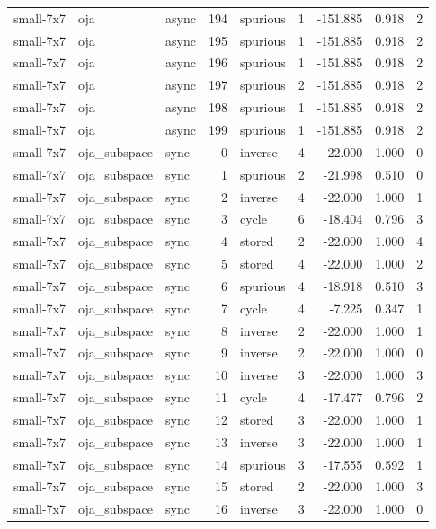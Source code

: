 \begin{tabular}{lllrlrrrr}
small-7x7 & oja & async & 194 & spurious & 1 & -151.885 & 0.918 & 2 \\
small-7x7 & oja & async & 195 & spurious & 1 & -151.885 & 0.918 & 2 \\
small-7x7 & oja & async & 196 & spurious & 1 & -151.885 & 0.918 & 2 \\
small-7x7 & oja & async & 197 & spurious & 2 & -151.885 & 0.918 & 2 \\
small-7x7 & oja & async & 198 & spurious & 1 & -151.885 & 0.918 & 2 \\
small-7x7 & oja & async & 199 & spurious & 1 & -151.885 & 0.918 & 2 \\
small-7x7 & oja\_subspace & sync & 0 & inverse & 4 & -22.000 & 1.000 & 0 \\
small-7x7 & oja\_subspace & sync & 1 & spurious & 2 & -21.998 & 0.510 & 0 \\
small-7x7 & oja\_subspace & sync & 2 & inverse & 4 & -22.000 & 1.000 & 1 \\
small-7x7 & oja\_subspace & sync & 3 & cycle & 6 & -18.404 & 0.796 & 3 \\
small-7x7 & oja\_subspace & sync & 4 & stored & 2 & -22.000 & 1.000 & 4 \\
small-7x7 & oja\_subspace & sync & 5 & stored & 4 & -22.000 & 1.000 & 2 \\
small-7x7 & oja\_subspace & sync & 6 & spurious & 4 & -18.918 & 0.510 & 3 \\
small-7x7 & oja\_subspace & sync & 7 & cycle & 4 & -7.225 & 0.347 & 1 \\
small-7x7 & oja\_subspace & sync & 8 & inverse & 2 & -22.000 & 1.000 & 1 \\
small-7x7 & oja\_subspace & sync & 9 & inverse & 2 & -22.000 & 1.000 & 0 \\
small-7x7 & oja\_subspace & sync & 10 & inverse & 3 & -22.000 & 1.000 & 3 \\
small-7x7 & oja\_subspace & sync & 11 & cycle & 4 & -17.477 & 0.796 & 2 \\
small-7x7 & oja\_subspace & sync & 12 & stored & 3 & -22.000 & 1.000 & 1 \\
small-7x7 & oja\_subspace & sync & 13 & inverse & 3 & -22.000 & 1.000 & 1 \\
small-7x7 & oja\_subspace & sync & 14 & spurious & 3 & -17.555 & 0.592 & 1 \\
small-7x7 & oja\_subspace & sync & 15 & stored & 2 & -22.000 & 1.000 & 3 \\
small-7x7 & oja\_subspace & sync & 16 & inverse & 3 & -22.000 & 1.000 & 0 \\

\end{tabular}
